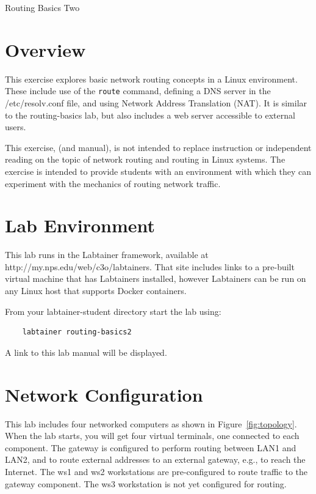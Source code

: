 


\begin{center}
{\LARGE Routing Basics Two}
\vspace{0.1in}\\
\end{center}

\copyrightnotice

\section{Overview}
This exercise explores basic network routing concepts 
in a Linux environment.  These include use of the \texttt{route}
command, defining a DNS server in the /etc/resolv.conf file,
and using Network Address Translation (NAT). It is similar to
the routing-basics lab, but also includes a web server accessible
to external users.

This exercise, (and manual), is not intended to replace instruction
or independent reading on the topic of network routing and
routing in Linux systems. The exercise is intended to provide
students with an environment with which they can experiment
with the mechanics of routing network traffic.


\section{Lab Environment}
This lab runs in the Labtainer framework,
available at http://my.nps.edu/web/c3o/labtainers.
That site includes links to a pre-built virtual machine
that has Labtainers installed, however Labtainers can
be run on any Linux host that supports Docker containers.

From your labtainer-student directory start the lab using:
\begin{verbatim}
    labtainer routing-basics2
\end{verbatim}
\noindent A link to this lab manual will be displayed.  

\section{Network Configuration}
This lab includes four networked computers as shown in Figure~\ref{fig:topology}.
When the lab starts, you will get four virtual terminals, one connected to each
component.
The gateway is configured to perform routing between LAN1 and LAN2, and to
route external addresses to an external gateway, e.g., to reach the Internet.
The ws1 and ws2 workstations are pre-configured to route traffic to the gateway
component.  The ws3 workstation is not yet configured for routing.

